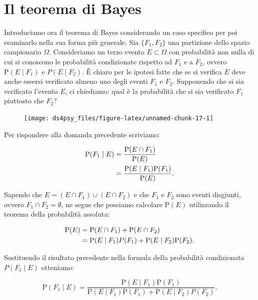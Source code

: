 \documentclass[
  11pt,
]{krantz}
\theoremstyle{definition}
\theoremstyle{definition}
\theoremstyle{definition}
\theoremstyle{definition}
\theoremstyle{remark}
\begin{document}
\hypertarget{il-teorema-di-bayes}{%
\section{Il teorema di Bayes}\label{il-teorema-di-bayes}}

Introduciamo ora il teorema di Bayes considerando un caso specifico per poi esaminarlo nella sua forma più generale. Sia \(\{F_1, F_2\}\) una partizione dello spazio campionario \(\Omega\). Consideriamo un terzo evento \(E \subset \Omega\) con probabilità non nulla di cui si conoscono le probabilità condizionate rispetto ad \(F_1\) e a \(F_2\), ovvero \({\mbox{P}}(E \mid F_1)\) e \(P(E \mid F_2)\). È chiaro per le ipotesi fatte che se si verifica \(E\) deve anche essersi verificato almeno uno degli eventi \(F_1\) e \(F_2\). Supponendo che si sia verificato l'evento \(E\), ci chiediamo: qual è la probabilità che si sia verificato \(F_1\) piuttosto che \(F_2\)?

\begin{figure}[h]

{\centering \texttt{[image: ds4psy\_files/figure-latex/unnamed-chunk-17-1]} 

}

\end{figure}

Per rispondere alla domanda precedente scriviamo:

\[
\begin{split}
{\mbox{P}}(F_1 \mid E) &= \frac{{\mbox{P}}(E \cap F_1)}{{\mbox{P}}(E)}\notag\\
              &= \frac{{\mbox{P}}(E \mid F_1){\mbox{P}}(F_1)}{{\mbox{P}}(E)}.
\end{split}
\]

Sapendo che \(E = (E \cap F_1) \cup (E \cap F_2)\) e che \(F_1\) e \(F_2\) sono eventi disgiunti, ovvero \(F_1 \cap F_2 = \emptyset\), ne segue che possiamo calcolare \({\mbox{P}}(E)\) utilizzando il teorema della probabilità assoluta:

\[
\begin{split}
{\mbox{P}}(E) &= {\mbox{P}}(E \cap F_1) + {\mbox{P}}(E \cap F_2)\notag\\
     &= {\mbox{P}}(E \mid F_1)P(F_1) + {\mbox{P}}(E \mid F_2){\mbox{P}}(F_2).
\end{split}
\]

\noindent Sostituendo il risultato precedente nella formula della probabilità condizionata \(P(F_1 \mid E)\) otteniamo:

\begin{equation}
{\mbox{P}}(F_1 \mid E) = \frac{{\mbox{P}}(E \mid F_1){\mbox{P}}(F_1)}{{\mbox{P}}(E \mid F_1){\mbox{P}}(F_1) + {\mbox{P}}(E \mid F_2)P(F_2)}.
\label{eq:bayes1}
\end{equation}
\end{document}

